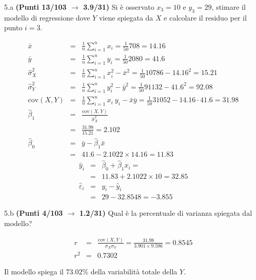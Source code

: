 \documentclass[
  11pt,
]{book}
\theoremstyle{mytheoremstyle}
\theoremstyle{mydefstyle}
\newenvironment{sol}
  {
  \begin{tcolorbox}[enhanced,breakable,arc=0.1mm,boxrule=1pt,colback=white,colframe=iblue,
  title=\bf \fontfamily{lmss}\selectfont \hspace{.5 cm} Soluzione,drop fuzzy shadow]

}{
\end{tcolorbox}
  }
\begin{document}
5.a \textbf{(Punti 13/103 \(\rightarrow\) 3.9/31)} Si è osservato \(x_3=10\) e \(y_3=29\), stimare il modello di regressione dove \(Y\) viene spiegata da \(X\) e calcolare il residuo per il punto \(i=3\).

\begin{sol}
\begin{eqnarray*}
           \bar x &=&\frac 1 n\sum_{i=1}^n x_i = \frac {1}{ 50 }  708 =  14.16 \\
           \bar y &=&\frac 1 n\sum_{i=1}^n y_i = \frac {1}{ 50 }  2080 =  41.6 \\
           \hat\sigma_X^2&=&\frac 1 n\sum_{i=1}^n x_i^2-\bar x^2=\frac {1}{ 50 }  10786  - 14.16 ^2= 15.21 \\
           \hat\sigma_Y^2&=&\frac 1 n\sum_{i=1}^n y_i^2-\bar y^2=\frac {1}{ 50 }  91132  - 41.6 ^2= 92.08 \\
           \text{cov}(X,Y)&=&\frac 1 n\sum_{i=1}^n x_i~y_i-\bar x\bar y=\frac {1}{ 50 }  31052 - 14.16 \cdot 41.6 = 31.98 \\
           \hat\beta_1 &=& \frac{\text{cov}(X,Y)}{\hat\sigma_X^2} \\
                    &=& \frac{ 31.98 }{ 15.21 }  =  2.102 \\
           \hat\beta_0 &=& \bar y - \hat\beta_1 \bar x\\
                    &=&  41.6 - 2.1022 \times  14.16 = 11.83 
         \end{eqnarray*}\begin{eqnarray*}
\hat y_i &=&\hat\beta_0+\hat\beta_1 x_i=\\ 
&=& 11.83 + 2.1022 \times 10 = 32.85 \\ 
\hat \varepsilon_i &=& y_i-\hat y_i\\ 
&=& 29 - 32.8548 = -3.855  
\end{eqnarray*}

\end{sol}

5.b \textbf{(Punti 4/103 \(\rightarrow\) 1.2/31)} Qual è la percentuale di varianza spiegata dal modello?

\begin{sol}
\begin{eqnarray*}
r&=&\frac{\text{cov}(X,Y)}{\sigma_X\sigma_Y}=\frac{ 31.98 }{ 3.901 \times 9.596 }= 0.8545 \\ 
r^2&=& 0.7302\end{eqnarray*}

Il modello spiega il \(73.02\%\) della variabilità totale della \(Y\).

\end{sol}
\end{document}
